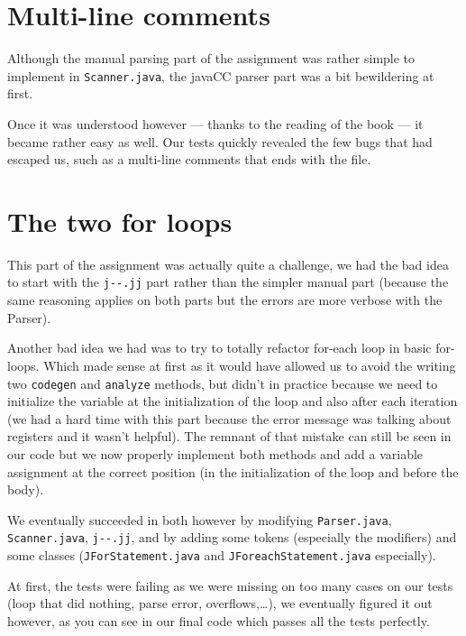 \documentclass[a4paper, 11pt]{article}
\begin{document}
    \section{Multi-line comments}

		Although the manual parsing part of the assignment was rather simple to
		implement in \verb#Scanner.java#, the javaCC parser part was a bit bewildering at first.
		\newline

		Once it was understood however --- thanks to the reading of the book --- it became
		rather easy as well. Our tests quickly revealed the few bugs that had escaped us,
		such as a multi-line comments that ends with the file.

	\section{The two for loops}

		This part of the assignment was actually quite a challenge, we had the
        bad idea to start with the \verb#j--.jj# part rather than the simpler
        manual part (because the same reasoning applies on both parts but
        the errors are more verbose with the Parser).\newline

		Another bad idea we had was to try to totally refactor for-each loop in
		basic for-loops. Which made sense at first as it would have allowed us
        to avoid the writing two \verb#codegen# and \verb#analyze# methods, but didn't in practice because we need to initialize the variable at the
        initialization of the loop and also after each iteration (we had a hard
        time with this part because the error message was talking about
        registers and it wasn't helpful). The remnant
        of that mistake can still be seen in our code but we now properly
        implement both methods and add a variable assignment at the correct
        position (in the initialization of the loop and before the body).\newline

		We eventually succeeded in both however by modifying \verb#Parser.java#,
        \verb#Scanner.java#, \verb#j--.jj#, and by adding some tokens
        (especially the modifiers) and some classes (\verb#JForStatement.java#
        and \verb#JForeachStatement.java# especially).\newline

		At first, the tests were failing as we were missing on too many cases on
        our tests (loop that did nothing, parse error, overflows,\ldots), we
        eventually figured it out however, as you can see in our final code
        which passes all the tests perfectly.
\end{document}

